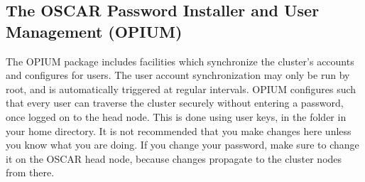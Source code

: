 %
%
%

\subsection{The OSCAR Password Installer and User Management (OPIUM)}
\label{app:opium-overview}

The OPIUM package includes facilities which synchronize the cluster's
accounts and configures  for users.  The user account
synchronization may only be run by root, and is automatically
triggered at regular intervals.
OPIUM configures  such that every user can traverse the
cluster securely without entering a password, once logged on to the
head node.  This is done using  user keys, in the 
folder in your home directory.  It is not recommended that you make
changes here unless you know what you are doing.
If you change your password, make sure to change it on the OSCAR head node,
because changes propagate to the cluster nodes from there.

